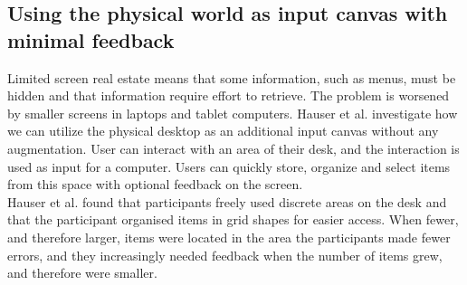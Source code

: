 \subsection{Using the physical world as input canvas with minimal feedback} %
\label{sub:use_desktop_as_input_canvas}

Limited screen real estate means that some information, such as menus, must be hidden and that information require effort to retrieve. The problem is worsened by smaller screens in laptops and tablet computers. Hauser et al. investigate how we can utilize the physical desktop as an additional input canvas without any augmentation. User can interact with an area of their desk, and the interaction is used as input for a computer. Users can quickly store, organize and select items from this space with optional feedback on the screen. \\
Hauser et al. found that participants freely used discrete areas on the desk and that the participant organised items in grid shapes for easier access. When fewer, and therefore larger, items were located in the area the participants made fewer errors, and they increasingly needed feedback when the number of items grew, and therefore were smaller.




